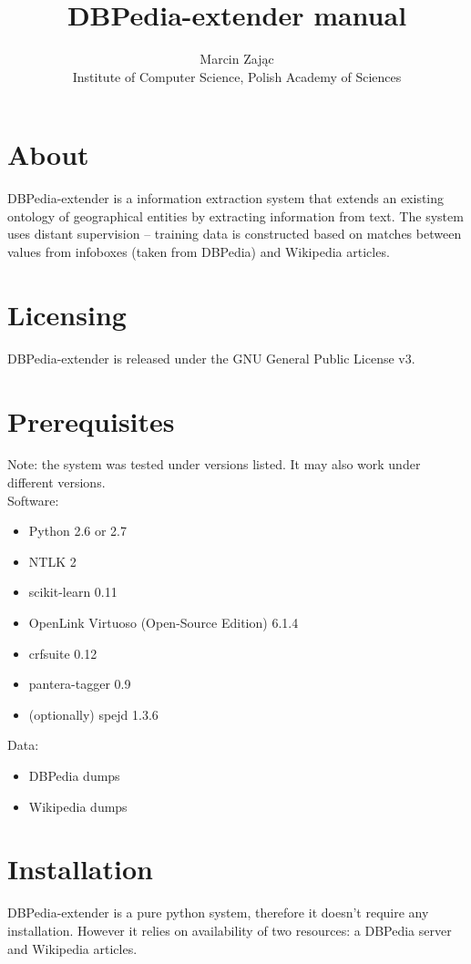 \documentclass[12pt]{article}
\author{Marcin Zając\\Institute of Computer Science, Polish Academy of Sciences}
\title{DBPedia-extender manual}
\begin{document}
    \maketitle
    \section{About}
    DBPedia-extender is a information extraction system that extends an existing ontology of geographical entities by extracting information from text. The system uses distant supervision – training data is constructed based on matches between values from infoboxes (taken from DBPedia) and Wikipedia articles.
    
    \section{Licensing}
    DBPedia-extender is released under the GNU General Public License v3.

    \section{Prerequisites}
    Note: the system was tested under versions listed. It may also work under different versions.\\
    Software:
    \begin{itemize}
        \item Python 2.6 or 2.7
        \item NTLK 2
        \item scikit-learn 0.11
        \item OpenLink Virtuoso (Open-Source Edition) 6.1.4
        \item crfsuite 0.12
        \item pantera-tagger 0.9
        \item (optionally) spejd 1.3.6
    \end{itemize}
    Data:
    \begin{itemize}
        \item DBPedia dumps
        \item Wikipedia dumps
    \end{itemize}
    
    \section{Installation}
    DBPedia-extender is a pure python system, therefore it doesn't require any installation.
    However it relies on availability of two resources: a DBPedia server and Wikipedia articles.
\end{document}
